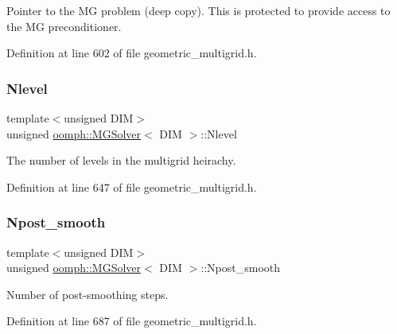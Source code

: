 Pointer to the MG problem (deep copy). This is protected to provide access to the MG preconditioner. 



Definition at line 602 of file geometric\+\_\+multigrid.\+h.

\mbox{\label{classoomph_1_1MGSolver_a4ab5b80c46b66867e720b1c28f170bb9}} 
\subsubsection{\texorpdfstring{Nlevel}{Nlevel}}
{\footnotesize\ttfamily template$<$unsigned D\+IM$>$ \\
unsigned \hyperlink{classoomph_1_1MGSolver}{oomph\+::\+M\+G\+Solver}$<$ D\+IM $>$\+::Nlevel\hspace{0.3cm}{\ttfamily [private]}}



The number of levels in the multigrid heirachy. 



Definition at line 647 of file geometric\+\_\+multigrid.\+h.

\mbox{\label{classoomph_1_1MGSolver_aa1bd9b32d6d5976582b57739bcc10b6d}} 
\subsubsection{\texorpdfstring{Npost\+\_\+smooth}{Npost\_smooth}}
{\footnotesize\ttfamily template$<$unsigned D\+IM$>$ \\
unsigned \hyperlink{classoomph_1_1MGSolver}{oomph\+::\+M\+G\+Solver}$<$ D\+IM $>$\+::Npost\+\_\+smooth\hspace{0.3cm}{\ttfamily [private]}}



Number of post-\/smoothing steps. 



Definition at line 687 of file geometric\+\_\+multigrid.\+h.

\mbox{\label{classoomph_1_1MGSolver_acc27929d8448646bd1551a32db05c966}} 
